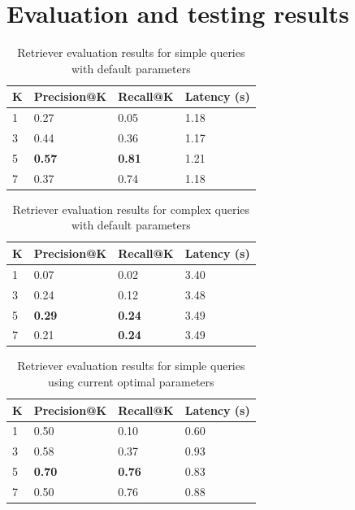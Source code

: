 \chapter{Evaluation and testing results}

\begin{table}[h!]
	\centering
	
	\begin{tabular}{p{0.5cm}p{2.5cm}p{2cm}p{4cm}}
		\hline
		\textbf{K} & \textbf{Precision@K} & \textbf{Recall@K} & \textbf{Latency (s)} \\
		\hline
		1 & 0.27 & 0.05 & 1.18 \\
		3 & 0.44 & 0.36 & 1.17 \\
		5 & \textbf{0.57} & \textbf{0.81} & 1.21 \\
		7 & 0.37 & 0.74 & 1.18 \\
		\hline
	\end{tabular}
	\caption{Retriever evaluation results for simple queries with default parameters}\label{tab:ret_simple}
\end{table}

\begin{table}[h!]
	\centering
	
	\begin{tabular}{p{0.5cm}p{2.5cm}p{2cm}p{4cm}}
		\hline
		\textbf{K} & \textbf{Precision@K} & \textbf{Recall@K} & \textbf{Latency (s)} \\
		\hline
		1 & 0.07 & 0.02 & 3.40 \\
		3 & 0.24 & 0.12 & 3.48 \\
		5 & \textbf{0.29} & \textbf{0.24} & 3.49 \\
		7 & 0.21 & \textbf{0.24} & 3.49 \\
		\hline
	\end{tabular}
	\caption{Retriever evaluation results for complex queries with default parameters}\label{tab:ret_complex}
\end{table}

\begin{table}[h!]
	\centering
	\begin{tabular}{p{0.5cm}p{2.5cm}p{2cm}p{4cm}}
		\hline
		\textbf{K} & \textbf{Precision@K} & \textbf{Recall@K} & \textbf{Latency (s)} \\
		\hline
		1 & 0.50 & 0.10 & 0.60 \\
		3 & 0.58 & 0.37 & 0.93 \\
		5 & \textbf{0.70} & \textbf{0.76} & 0.83 \\
		7 & 0.50 & 0.76 & 0.88 \\
		\hline
	\end{tabular}
	\caption{Retriever evaluation results for simple queries using current optimal parameters}\label{tab:ret_simple_updated}
\end{table}


